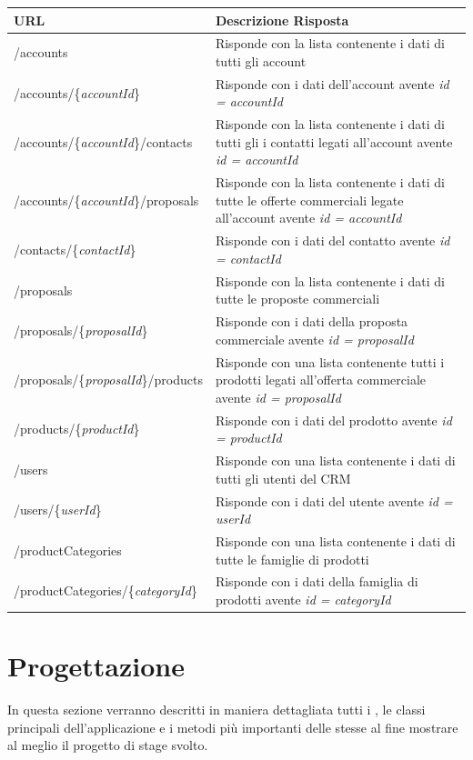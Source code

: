 	\begin{small}
		\begin{longtable}{ | l | p{8cm} | }
			\hline \textbf{URL} & \textbf{Descrizione Risposta}\\
			\hline /accounts & Risponde con la lista contenente i dati di tutti gli account\\
			\hline /accounts/\{\textit{accountId}\} & Risponde con i dati dell'account avente \textit{id = accountId}\\    
			\hline /accounts/\{\textit{accountId}\}/contacts & Risponde con la lista contenente i dati di tutti gli i contatti legati all'account avente \textit{id = accountId}\\
			\hline /accounts/\{\textit{accountId}\}/proposals & Risponde con la lista contenente i dati di tutte le offerte commerciali legate all'account avente \textit{id = accountId}\\
			\hline /contacts/\{\textit{contactId}\} & Risponde con i dati del contatto avente \textit{id = contactId}\\
			\hline /proposals & Risponde con la lista contenente i dati di tutte le proposte commerciali\\
			\hline /proposals/\{\textit{proposalId}\} & Risponde con i dati della proposta commerciale avente \textit{id = proposalId}\\    
			\hline /proposals/\{\textit{proposalId}\}/products & Risponde con una lista contenente tutti i prodotti legati all'offerta commerciale avente \textit{id =  proposalId}\\
			\hline /products/\{\textit{productId}\} & Risponde con i dati del prodotto avente \textit{id = productId}\\
			\hline /users & Risponde con una lista contenente i dati di tutti gli utenti del CRM\\
			\hline /users/\{\textit{userId}\} & Risponde con i dati del utente avente \textit{id = userId}\\    
			\hline /productCategories & Risponde con una lista contenente i dati di tutte le famiglie di prodotti\\
			\hline /productCategories/\{\textit{categoryId}\} & Risponde con i dati della famiglia di prodotti avente \textit{id = categoryId}\\		
			\hline 
		\end{longtable}		
	\end{small}
	
\section{Progettazione}
In questa sezione verranno descritti in maniera dettagliata tutti i , le classi principali dell'applicazione e i metodi più importanti delle stesse al fine mostrare al meglio il progetto di stage svolto.

